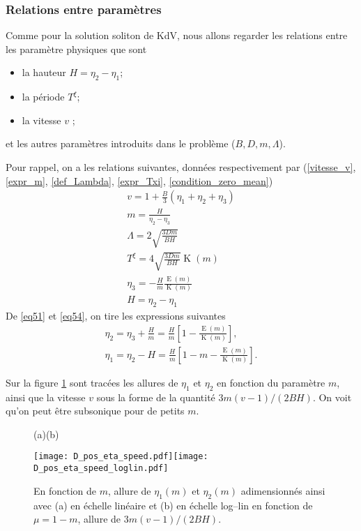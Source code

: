 \documentclass[10pt,a4paper, oneside, fleqn]{myarticle}
\DeclareMathOperator{\ellipE}{E}
\DeclareMathOperator{\ellipK}{K}
\begin{document}
\subsubsection{Relations entre paramètres}

Comme pour la solution soliton de KdV, nous allons regarder les relations entre les paramètre physiques que sont
\begin{itemize}
\item la hauteur $H=\eta_2-\eta_1$;
\item la période $T^\xi$;
\item la vitesse $v$ ;
\end{itemize}
et les autres paramètres introduits dans le problème ($B, D, m, \Lambda$).

\bigskip

Pour rappel, on a les relations suivantes, données respectivement par (\ref{vitesse_v}, \ref{expr_m}, \ref{def_Lambda}, \ref{expr_Txi}, \ref{condition_zero_mean})
\begin{gather}
  v=1 + \frac{B}{3}(\eta_1+\eta_2+\eta_3)\\
  m=\frac{H}{\eta_2-\eta_3}\label{eq51}\\
  \Lambda = 2\sqrt{\frac{3 Dm}{B H}}\\
  T^\xi = 4 \sqrt{\frac{3 D m}{B H}}\ellipK(m)\\
  \eta_3 = - \frac{H}{m} \frac{\ellipE(m)}{\ellipK(m)}\label{eq54}\\
  H = \eta_2-\eta_1
\end{gather}
De \eqref{eq51} et \eqref{eq54}, on tire les expressions suivantes
\begin{gather}
  \eta_2 = \eta_3 + \frac{H}{m}
  = \frac{H}{m}\left[ 1-\frac{\ellipE(m)}{\ellipK(m)}\right],\\
  \eta_1 = \eta_2 - H = \frac{H}{m}\left[ 1-m-\frac{\ellipE(m)}{\ellipK(m)}\right].
\end{gather}

Sur la figure \ref{fig_eta_speed} sont tracées les allures de $\eta_1$ et $\eta_2$ en fonction du paramètre $m$, ainsi que la vitesse $v$ sous la forme de la quantité $3m(v-1)/(2BH)$. On voit qu'on peut être subsonique pour de petits $m$.

\begin{figure}[ht!]
  \centering
  \quad(a)\hspace*{6cm}(b)
  
  \texttt{[image: D\_pos\_eta\_speed.pdf]}\texttt{[image: D\_pos\_eta\_speed\_loglin.pdf]}
  \caption{En fonction de $m$, allure de $\eta_1(m)$ et $\eta_2(m)$ adimensionnés ainsi avec (a) en échelle linéaire et (b) en échelle log--lin en fonction de $\mu=1-m$, allure de $3m(v-1)/(2BH)$.}\label{fig_eta_speed}
\end{figure}
\end{document}
